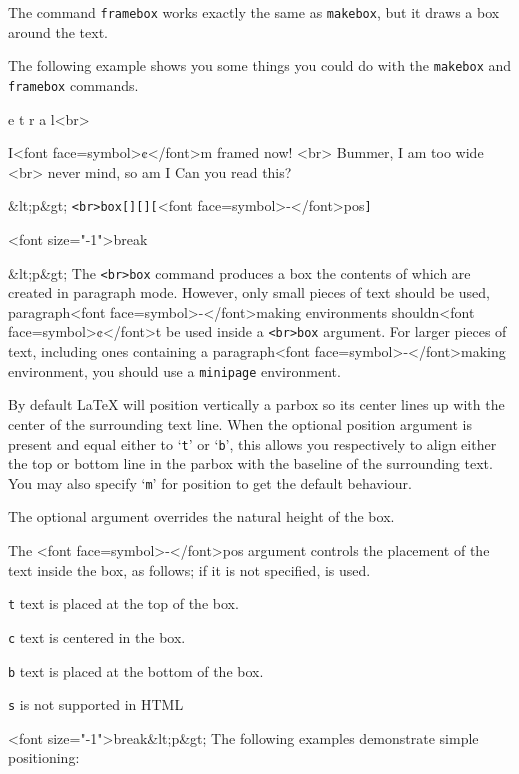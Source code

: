The command \verb|framebox| works exactly the same as \verb|makebox|, but it
draws a box around the text.

The following example shows you some things you could do with
the \verb|makebox| and \verb|framebox| commands.

\beginquote
  \fbox\makebox[10cm][c]\textbfc e \textbfn t r a l<br>

  \frameboxGuess I<font face=symbol>¢</font>m framed now! <br>
  \framebox[2cm][r]Bummer, I am too wide <br>
  \framebox[1cm][l]never mind, so am I
  Can you read this?
\endquote


\bigbreak

&lt;p&gt;\fbox
\verb|<br>box[|\emphpos\verb|][|\emphheight\verb|][|\emphinner<font face=symbol>-</font>pos\verb|]|\emphwidth\verb||\emphtext\verb||


<font size="-1">break

&lt;p&gt;
The \verb|<br>box| command produces a box the contents of which are created in paragraph mode. However, only small
pieces of text should be used, paragraph<font face=symbol>-</font>making environments shouldn<font face=symbol>¢</font>t be used inside a \verb|<br>box| argument. For
larger pieces of text, including ones containing a paragraph<font face=symbol>-</font>making environment, you should use a \verb|minipage|
environment.

By default LaTeX will position vertically a parbox so its center lines up with the center of the surrounding text line.
When the optional position argument is present and equal either to ‘\verb|t|’ or ‘\verb|b|’, this allows you respectively
to align either the top or bottom line in the parbox with the baseline of the surrounding text. You may also specify
‘\verb|m|’ for position to get the default behaviour.

The optional \emphheight argument overrides the natural height of the box.

The \emphinner<font face=symbol>-</font>pos argument controls the placement of the text inside the box, as follows; if it is not specified, \emphpos is used.

\verb|t| text is placed at the top of the box.

\verb|c| text is centered in the box.

\verb|b| text is placed at the bottom of the box.

\verb|s| is not supported in HTML

<font size="-1">break&lt;p&gt;
The following examples demonstrate simple positioning:

